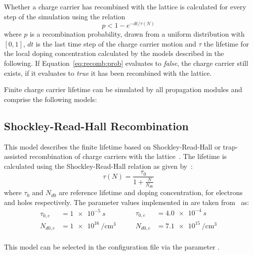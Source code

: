Whether a charge carrier has recombined with the lattice is calculated for every step of the simulation using the relation
\begin{equation}
    \label{eq:recomb:prob}
    p < 1 - e^{- dt / \tau(N)}
\end{equation}
where $p$ is a recombination probability, drawn from a uniform distribution with $[0, 1]$, $dt$ is the last time step of the charge carrier motion and $\tau$ the lifetime for the local doping concentration calculated by the models described in the following.
If Equation~\eqref{eq:recomb:prob} evaluates to \emph{false}, the charge carrier still exists, if it evaluates to \emph{true} it has been recombined with the lattice.

Finite charge carrier lifetime can be simulated by all propagation modules and comprise the following models:

\subsection{Shockley-Read-Hall Recombination}

This model describes the finite lifetime based on Shockley-Read-Hall or trap-assisted recombination of charge carriers with the lattice~\cite{shockley-read,hall}.
The lifetime is calculated using the Shockley-Read-Hall relation as given by~\cite{fossum-lee}:
\begin{equation}
    \tau(N) = \frac{\tau_0}{1 + \frac{N}{N_{d0}}}
\end{equation}
where $\tau_0$ and $N_{d0}$ are reference lifetime and doping concentration, for electrons and holes respectively.
The parameter values implemented in \apsq are taken from~\cite{fossum} as:
\begin{equation*}
    \begin{split}
        \tau_{0,e} &= \SI{1e-5}{s} \\
        N_{d0,e}   &= \SI{1e16}{\per \cubic \cm} \\
    \end{split}
    \qquad
    \begin{split}
        \tau_{0,e} &= \SI{4.0e-4}{s} \\
        N_{d0,e}   &= \SI{7.1e15}{\per \cubic \cm} \\
    \end{split}
\end{equation*}

This model can be selected in the configuration file via the parameter .

